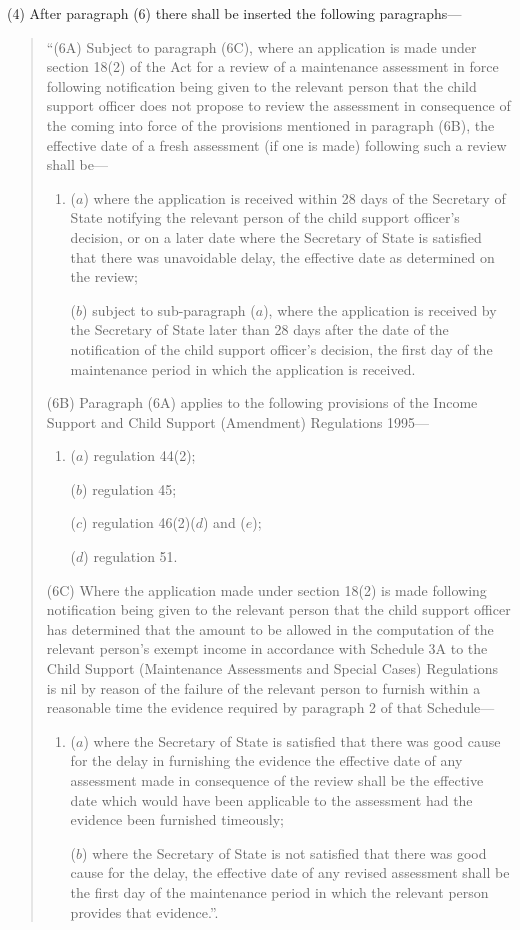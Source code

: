 \documentclass[12pt,a4paper]{article}
\begin{document}
(4) After paragraph (6) there shall be inserted the following paragraphs—
\begin{quotation}
“(6A) Subject to paragraph (6C), where an application is made under section 18(2) of the Act for a review of a maintenance assessment in force following notification being given to the relevant person that the child support officer does not propose to review the assessment in consequence of the coming into force of the provisions mentioned in paragraph (6B), the effective date of a fresh assessment (if one is made) following such a review shall be—
\begin{enumerate}\item[]
($a$) where the application is received within 28 days of the Secretary of State notifying the relevant person of the child support officer’s decision, or on a later date where the Secretary of State is satisfied that there was unavoidable delay, the effective date as determined on the review;

($b$) subject to sub-paragraph ($a$), where the application is received by the Secretary of State later than 28 days after the date of the notification of the child support officer’s decision, the first day of the maintenance period in which the application is received.
\end{enumerate}

(6B) Paragraph (6A) applies to the following provisions of the Income Support and Child Support (Amendment) Regulations 1995—
\begin{enumerate}\item[]
($a$) regulation 44(2);

($b$) regulation 45;

($c$) regulation 46(2)($d$) and ($e$);

($d$) regulation 51.
\end{enumerate}

(6C) Where the application made under section 18(2) is made following notification being given to the relevant person that the child support officer has determined that the amount to be allowed in the computation of the relevant person’s exempt income in accordance with Schedule 3A to the Child Support (Maintenance Assessments and Special Cases) Regulations is nil by reason of the failure of the relevant person to furnish within a reasonable time the evidence required by paragraph 2 of that Schedule—
\begin{enumerate}\item[]
($a$) where the Secretary of State is satisfied that there was good cause for the delay in furnishing the evidence the effective date of any assessment made in consequence of the review shall be the effective date which would have been applicable to the assessment had the evidence been furnished timeously;

($b$) where the Secretary of State is not satisfied that there was good cause for the delay, the effective date of any revised assessment shall be the first day of the maintenance period in which the relevant person provides that evidence.”.
\end{enumerate}
\end{quotation}
\end{document}

